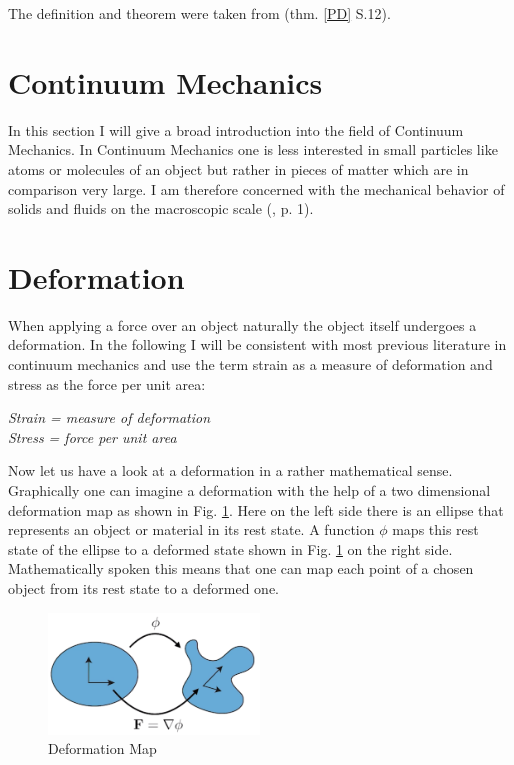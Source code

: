 The definition and theorem were taken from \cite{Spencer1980} (thm. \ref{PD} S.12).





\section{Continuum Mechanics}
In this section I will give a broad introduction into the field of Continuum Mechanics. In Continuum Mechanics one is less interested in small particles like atoms or molecules of an object but rather in pieces of matter which are in comparison very large. I am therefore concerned with the mechanical behavior of solids and fluids on the macroscopic scale (\cite{Spencer1980}, p. 1).


\section{Deformation}
When applying a force over an object naturally the object itself undergoes a deformation. In the following I will be consistent with most previous literature in continuum mechanics and use the term strain as a measure of deformation and stress as the force per unit area:

\begin{addmargin}[2cm]{2cm}
\textit{Strain = measure of deformation}  \\
\textit{Stress = force per unit area} 
\end{addmargin}




Now let us have a look at a deformation in a rather mathematical sense. Graphically one can imagine a deformation with the help of a two dimensional deformation map as shown in Fig. \ref{fig:deformationmap}. Here on the left side there is an ellipse that represents an object or material in its rest state. A function $\phi$ maps this rest state of the ellipse to a deformed state shown in Fig. \ref{fig:deformationmap} on the right side. Mathematically spoken this means that one can map each point of a chosen object from its rest state to a deformed one.

\begin{figure}[!htbp]
	\centering
	\includegraphics[width=0.5\textwidth]{resources/deformation_map}
	\caption{Deformation Map {\cite{STREAM2018}}}
	\label{fig:deformationmap}
\end{figure}

